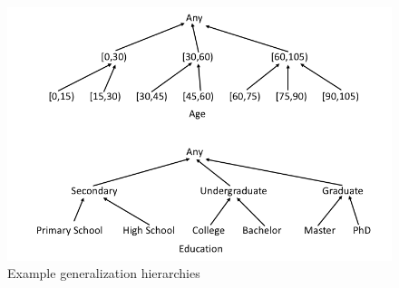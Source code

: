 \begin{figure}[H]
    \centering
    \includegraphics[scale=0.5]{Images/GenHier}
    \caption{Example generalization hierarchies}
    \label{fig:genhier}
\end{figure}

